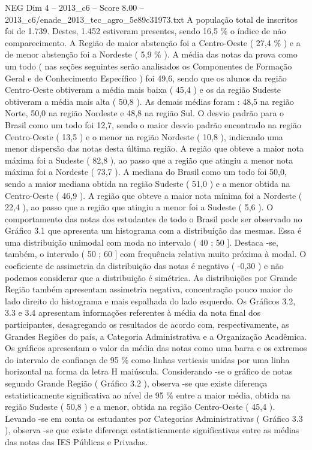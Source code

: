 \begin{textsample}{NEG Dim 4 – 2013\_c6 – Score 8.00 – 2013\_c6/enade\_2013\_tec\_agro\_5e89c31973.txt}
A população total de inscritos foi de 1.739.
Destes, 1.452 estiveram presentes, sendo 16,5 \% o índice de não comparecimento.
A Região de maior abstenção foi a Centro-Oeste ( 27,4 \% ) e a de menor abstenção foi a Nordeste ( 5,9 \% ).
A média das notas da prova como um todo ( nas seções seguintes serão analisados os Componentes de Formação Geral e de Conhecimento Específico ) foi 49,6, sendo que os alunos da região Centro-Oeste obtiveram a média mais baixa ( 45,4 ) e os da região Sudeste obtiveram a média mais alta ( 50,8 ).
As demais médias foram : 48,5 na região Norte, 50,0 na região Nordeste e 48,8 na região Sul.
O desvio padrão para o Brasil como um todo foi 12,7, sendo o maior desvio padrão encontrado na região Centro-Oeste ( 13,5 ) e o menor na região Nordeste ( 10,8 ), indicando uma menor dispersão das notas desta última região.
A região que obteve a maior nota máxima foi a Sudeste ( 82,8 ), ao passo que a região que atingiu a menor nota máxima foi a Nordeste ( 73,7 ).
A mediana do Brasil como um todo foi 50,0, sendo a maior mediana obtida na região Sudeste ( 51,0 ) e a menor obtida na Centro-Oeste ( 46,9 ).
A região que obteve a maior nota mínima foi a Nordeste ( 22,4 ), ao passo que a região que atingiu a menor foi a Sudeste ( 5,6 ).
O comportamento das notas dos estudantes de todo o Brasil pode ser observado no Gráfico 3.1 que apresenta um histograma com a distribuição das mesmas.
Essa é uma distribuição unimodal com moda no intervalo ( 40 ; 50 ].
Destaca -se, também, o intervalo ( 50 ; 60 ] com frequência relativa muito próxima à modal.
O coeficiente de assimetria da distribuição das notas é negativo ( -0,30 ) e não podemos considerar que a distribuição é simétrica.
As distribuições por Grande Região também apresentam assimetria negativa, concentração pouco maior do lado direito do histograma e mais espalhada do lado esquerdo.
Os Gráficos 3.2, 3.3 e 3.4 apresentam informações referentes à média da nota final dos participantes, desagregando os resultados de acordo com, respectivamente, as Grandes Regiões do país, a Categoria Administrativa e a Organização Acadêmica.
Os gráficos apresentam o valor da média das notas como uma barra e os extremos do intervalo de confiança de 95 \% como linhas verticais unidas por uma linha horizontal na forma da letra H maiúscula.
Considerando -se o gráfico de notas segundo Grande Região ( Gráfico 3.2 ), observa -se que existe diferença estatisticamente significativa ao nível de 95 \% entre a maior média, obtida na região Sudeste ( 50,8 ) e a menor, obtida na região Centro-Oeste ( 45,4 ).
Levando -se em conta os estudantes por Categorias Administrativas ( Gráfico 3.3 ), observa -se que existe diferença estatisticamente significativas entre as médias das notas das IES Públicas e Privadas.

\end{textsample}
